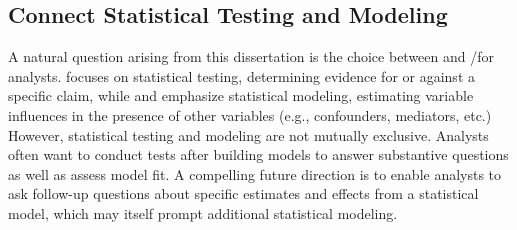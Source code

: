 \begin{comment}
\subsection{Support more phases of the data lifecycle}
This dissertation emphasizes the need for abstractions that capture analysts'
implicit domain knowledge. These abstractions enable valid analysis formulation
and promote reflective thinking. Building upon this, we can begin to ask how the
same ideas---abstractions and automated reasoning for conceptual knowledge often
implicit in statistical analyses---could apply to other phases of the data
lifecycle. Future work should explore how to elicit and track the evolution of
conceptual knowledge even before statistical analysis by developing new
elicitation techniques and representations of domain knowledge and ecosystem of
inter-operating tools to track and ensure validity throughout the data lifecycle. 

\end{comment}

\subsection{Connect Statistical Testing and Modeling} 
A natural question arising from this dissertation is the choice between \tea and
\tisane/\rTisane for analysts. \tea focuses on statistical testing, determining
evidence for or against a specific claim, while \tisane and \rTisane emphasize
statistical modeling, estimating variable influences in the presence of other
variables (e.g., confounders, mediators, etc.) However, statistical testing and
modeling are not mutually exclusive. Analysts often want to conduct tests after
building models to answer substantive questions as well as assess model fit. A
compelling future direction is to enable analysts to ask follow-up questions
about specific estimates and effects from a statistical model, which may itself
prompt additional statistical modeling. 

